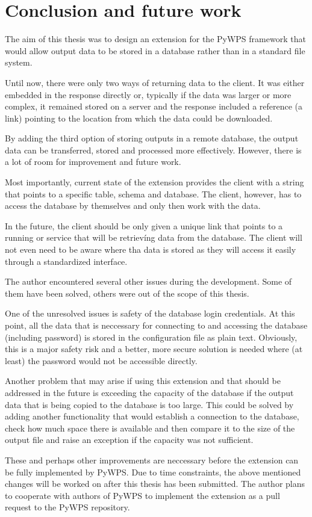\chapter{Conclusion and future work}
\label{5-conclusion}


The aim of this thesis was to design an extension for the PyWPS framework that would allow output data to be stored in a database rather than in a standard file system. 

Until now, there were only two ways of returning data to the client. It was either embedded in the response directly or, typically if the data was larger or more complex, it remained stored on a server and the response included a reference (a  link) pointing to the location from which the data could be downloaded.

By adding the third option of storing outputs in a remote database, the output data can be transferred, stored and processed more effectively. However, there is a lot of room for improvement and future work. 

Most importantly, current state of the extension provides the client with a string that points to a specific table, schema and database. The client, however, has to access the database by themselves and only then work with the data. 

In the future, the client should be only given a unique  link that points to a running  or  service that will be retrievíng data from the database. The client will not even need to be aware where tha data is stored as they will access it easily through a standardized interface. 

The author encountered several other issues during the development. Some of them have been solved, others were out of the scope of this thesis. 

One of the unresolved issues is safety of the database login credentials. At this point, all the data that is neccessary for connecting to and accessing the database (including password) is stored in the configuration file as plain text. Obviously, this is a major safety risk and a better, more secure solution is needed where (at least) the password would not be accessible directly. 

Another problem that may arise if using this extension and that should be addressed in the future is exceeding the capacity of the database if the output data that is being copied to the database is too large. This could be solved by adding another functionality that would establish a connection to the database, check how much space there is available and then compare it to the size of the output file and raise an exception if the capacity was not sufficient.

These and perhaps other improvements are neccessary before the extension can be fully implemented by PyWPS. Due to time constraints, the above mentioned changes will be worked on after this thesis has been submitted. The author plans to cooperate with authors of PyWPS to implement the extension as a pull request to the PyWPS repository.



